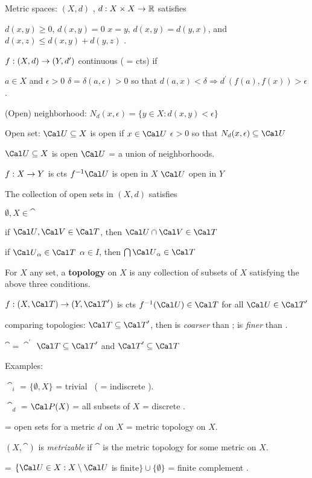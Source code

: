  Metric spaces: $(X,d)$ , $d: X\times X \rightarrow {\Bbb R}$ satisfies 

\hsk $d(x,y)\geq 0$, $d(x,y)=0$ \lra $x=y$, $d(x,y)=d(y,x)$, and $d(x,z)\leq d(x,y)+d(y,z)$ .

$f:(X,d)\rightarrow (Y,d^\prime)$ continuous ( = cts) if 

\hsk \foa $a\in X$ and \foa $\epsilon > 0$ \exs $\delta = \delta(a,\epsilon) > 0$
so that $d(a,x) < \delta \Rightarrow d^\prime(f(a),f(x)) > \epsilon$.

(Open) neighborhood: $N_d(x,\epsilon) = \{y\in X : d(x,y) < \epsilon\}$

Open set: $\cau\sset X$ is open if \foa $x\in\cau$ \exs $\epsilon > 0$ so that $N_d(x,\epsilon)\sset \cau$

\hsk $\cau\sset X$ is open \lra $\cau$ = a union of neighborhoods.

\hsk $f : X\rightarrow Y$ is cts \lra $\finv\cau$ is open in $X$ \foa $\cau$ open in $Y$

The collection \catm of open sets in $(X,d)$ satisfies

\hsk $\emptyset, X\in \cat$ 

\hsk if $\cau,\cav\in \cat$, then $\cau\cap\cav\in \cat$

\hsk if $\cau_\alpha\in \cat$ \foa $\alpha\in I$, then $\bigcap\cau_\alpha\in \cat$

\msk

\ni For $X$ any set, a {\bf topology} on $X$ is any collection \catm of subsets of $X$ satisfying the above three conditions.

$f : (X,\cat)\ra (Y,\cat^\prime)$ is cts \lra $\finv(\cau)\in\cat$  for all  $\cau\in\cat^\prime$

comparing topologies: $\cat\sset\cat^\prime$, then \catm is {\it coarser} than \catpm ; \catpm is {\it finer} than \catm .

$\cat=\cat^\prime$ \lra $\cat\sset\cat^\prime$ and $\cat^\prime\sset\cat$

\ni Examples: 

$\cat_i$ = $\{\emptyset, X\}$ = trivial \top\ ( = indiscrete \top).

$\cat_d$ = ${\Cal P}(X)$ = all subsets of $X$ = discrete \top.

\catm = open sets for a metric $d$ on $X$ = metric topology on $X$.

\hsk $(X,\cat)$ is {\it metrizable} if $\cat$ is the metric topology for some metric on $X$.

\catm = $\{\cau\in X : X\smin\cau$ is finite$\}\cup\{\emptyset\}$ = finite complement \top.

